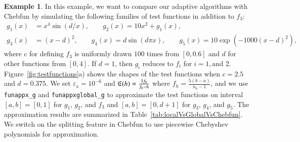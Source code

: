 \documentclass[review]{elsarticle}
\newcommand{\abstol}{\varepsilon_{\textrm{a}}}
\theoremstyle{definition}
\newtheorem{exmp}{Example}
\newcommand{\funappxg}{\texttt{funappx\_g\xspace}}
\begin{document}

\begin{exmp}
In this example, we want to compare our adaptive algorithms with Chebfun by
simulating the following families of test functions in addition to $f_3$:
%
\begin{align*}
 g_1(x) &= x^4 \sin(d/x), \qquad
 g_2(x) = 10  x^2 + g_1(x),
\\ g_3(x) & = (x-d)^2,  \qquad
 g_4(x)= d\sin(d\pi x), \qquad
 g_5(x)= 10\exp\left(-1000(x-d)^2\right), \qquad
\end{align*}
where $c$ for defining $f_3$ is uniformly drawn $100$ times from $[0,0.6]$ and
$d$ for other functions from $[0,4]$. If $d=1$, then $g_i$ reduces to $f_i$ for
$i=1, \mbox{and } 2$. Figure~\ref{fig:testfunctions}a) shows the shapes of the
test functions when $c=2.5$ and $d=0.375$. We set $\abstol = 10^{-6}$ and $\mathfrak{C}
(h) = \frac{ 3 f_h}{f_h-h}$ where $f_h = \frac{5(b-a)}{n_0-1}$, and we use
\texttt{funappx\_g} and \texttt{funappxglobal\_g} to approximate the test
functions on interval $[a,b]=[0,1]$ for $g_1$, $g_2$, and $f_3$ and
$[a,b]=[0,d+1]$ for $g_3$, $g_4$, and $g_5$. The approximation results are
summarized in Table~\ref{tab:localVsGlobalVsChebfun}. We switch on the splitting
feature in Chebfun to use piecewise Chebyshev polynomials for approximation.


\end{exmp}
\end{document}
